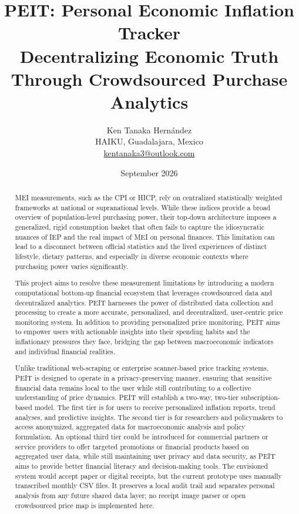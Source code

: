 \documentclass[10pt,a4paper]{article}
\title{PEIT: Personal Economic Inflation Tracker\\
\large Decentralizing Economic Truth Through Crowdsourced Purchase Analytics}
\author{Ken Tanaka Hernández\\
  \small HAIKU, Guadalajara, Mexico\\
\small \href{mailto:kentanaka3@outlook.com}{kentanaka3@outlook.com}}
\date{September 2026}
\begin{document}
\maketitle

\begin{abstract}
  \ac{MEI} measurements, such as the \ac{CPI} or \ac{HICP}, rely on centralized
  statistically weighted frameworks at national or supranational levels. While
  these indices provide a broad overview of population-level purchasing power,
  their top-down architecture imposes a generalized, rigid consumption basket
  that often fails to capture the idiosyncratic nuances of \ac{IEP} and the
  real impact of \ac{MEI} on personal finances. This limitation can lead to a
  disconnect between official statistics and the lived experiences of distinct
  lifestyle, dietary patterns, and especially in diverse economic contexts
  where purchasing power varies significantly.

  This project aims to resolve these measurement limitations by introducing a
  modern computational bottom-up financial ecosystem that leverages
  crowdsourced data and decentralized analytics. \ac{PEIT} harnesses the power
  of distributed data collection and processing to create a more accurate,
  personalized, and decentralized, user-centric price monitoring system. In
  addition to providing personalized price monitoring, \ac{PEIT} aims to
  empower users with actionable insights into their spending habits and the
  inflationary pressures they face, bridging the gap between macroeconomic
  indicators and individual financial realities.

  Unlike traditional web-scraping or enterprise scanner-based price tracking
  systems, \ac{PEIT} is designed to operate in a privacy-preserving manner,
  ensuring that sensitive financial data remains local to the user while still
  contributing to a collective understanding of price dynamics. \ac{PEIT} will
  establish a two-way, two-tier subscription-based model. The first tier is for
  users to receive personalized inflation reports, trend analyses, and
  predictive insights. The second tier is for researchers and policymakers to
  access anonymized, aggregated data for macroeconomic analysis and policy
  formulation. An optional third tier could be introduced for commercial
  partners or service providers to offer targeted promotions or financial
  products based on aggregated user data, while still maintaining user privacy
  and data security, as \ac{PEIT} aims to provide better financial literacy and
  decision-making tools. The envisioned system would accept paper or digital
  receipts, but the current prototype uses manually transcribed monthly CSV
  files. It preserves a local audit trail and separates personal analysis from
  any future shared data layer; no receipt image parser or open crowdsourced
  price map is implemented here.


\end{abstract}
\end{document}
